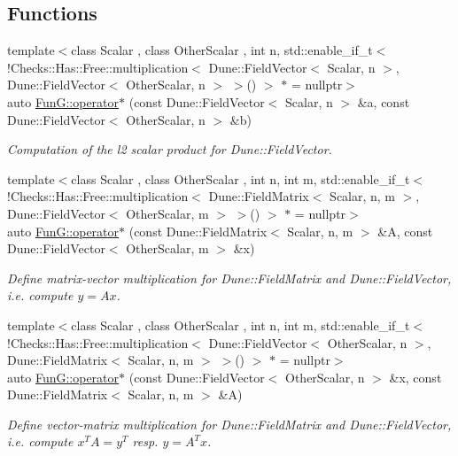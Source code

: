 \subsection*{\-Functions}
\begin{DoxyCompactItemize}
\item 
{\footnotesize template$<$class Scalar , class Other\-Scalar , int n, std\-::enable\-\_\-if\-\_\-t$<$ !\-Checks\-::\-Has\-::\-Free\-::multiplication$<$ Dune\-::\-Field\-Vector$<$ Scalar, n $>$, Dune\-::\-Field\-Vector$<$ Other\-Scalar, n $>$ $>$() $>$ $\ast$  = nullptr$>$ }\\auto \hyperlink{namespaceFunG_a5e258023361844926f485229c62a733b}{\-Fun\-G\-::operator$\ast$} (const \-Dune\-::\-Field\-Vector$<$ \-Scalar, n $>$ \&a, const \-Dune\-::\-Field\-Vector$<$ \-Other\-Scalar, n $>$ \&b)
\begin{DoxyCompactList}\small\item\em \-Computation of the l2 scalar product for \-Dune\-::\-Field\-Vector. \end{DoxyCompactList}\item 
{\footnotesize template$<$class Scalar , class Other\-Scalar , int n, int m, std\-::enable\-\_\-if\-\_\-t$<$ !\-Checks\-::\-Has\-::\-Free\-::multiplication$<$ Dune\-::\-Field\-Matrix$<$ Scalar, n, m $>$, Dune\-::\-Field\-Vector$<$ Other\-Scalar, m $>$ $>$() $>$ $\ast$  = nullptr$>$ }\\auto \hyperlink{namespaceFunG_abadb8da34a5abc3dde0107231ab91c6f}{\-Fun\-G\-::operator$\ast$} (const \-Dune\-::\-Field\-Matrix$<$ \-Scalar, n, m $>$ \&\-A, const \-Dune\-::\-Field\-Vector$<$ \-Other\-Scalar, m $>$ \&x)
\begin{DoxyCompactList}\small\item\em \-Define matrix-\/vector multiplication for \-Dune\-::\-Field\-Matrix and \-Dune\-::\-Field\-Vector, i.\-e. compute $y=Ax$. \end{DoxyCompactList}\item 
{\footnotesize template$<$class Scalar , class Other\-Scalar , int n, int m, std\-::enable\-\_\-if\-\_\-t$<$ !\-Checks\-::\-Has\-::\-Free\-::multiplication$<$ Dune\-::\-Field\-Vector$<$ Other\-Scalar, n $>$, Dune\-::\-Field\-Matrix$<$ Scalar, n, m $>$ $>$() $>$ $\ast$  = nullptr$>$ }\\auto \hyperlink{namespaceFunG_a19a9d7b55b56f5101560034413a1dbfe}{\-Fun\-G\-::operator$\ast$} (const \-Dune\-::\-Field\-Vector$<$ \-Other\-Scalar, n $>$ \&x, const \-Dune\-::\-Field\-Matrix$<$ \-Scalar, n, m $>$ \&\-A)
\begin{DoxyCompactList}\small\item\em \-Define vector-\/matrix multiplication for \-Dune\-::\-Field\-Matrix and \-Dune\-::\-Field\-Vector, i.\-e. compute $x^T A = y^T$ resp. $y=A^T x$. \end{DoxyCompactList}\item 

\end{DoxyCompactItemize}

